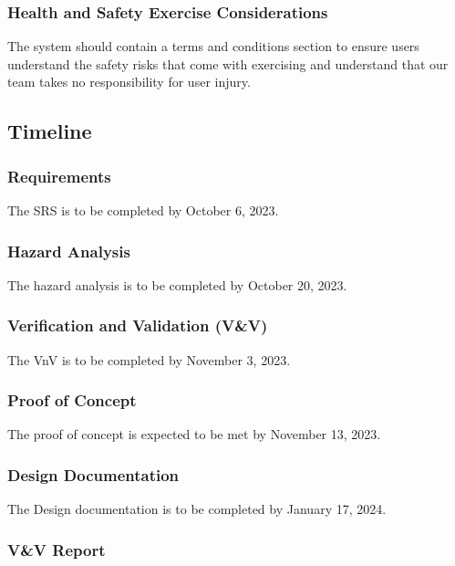 \documentclass[12pt]{article}
\begin{document}
\subsubsection{Health and Safety Exercise Considerations}

The system should contain a terms and conditions section to ensure users understand the safety risks that come with exercising and understand that our team takes no responsibility for user injury.

\subsection{Timeline}

\subsubsection{Requirements}

The SRS is to be completed by October 6, 2023.

\subsubsection{Hazard Analysis}

The hazard analysis is to be completed by October 20, 2023.

\subsubsection{Verification and Validation (V\&V)}

The VnV is to be completed by November 3, 2023.

\subsubsection{Proof of Concept}

The proof of concept is expected to be met by November 13, 2023.

\subsubsection{Design Documentation}

The Design documentation is to be completed by January 17, 2024.

\subsubsection{V\&V Report}
\end{document}
